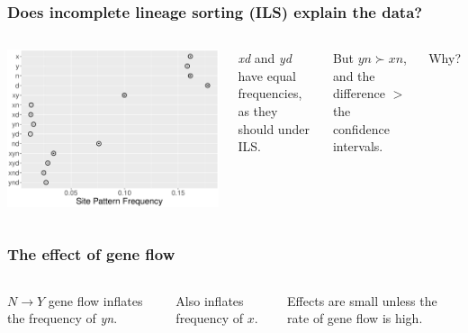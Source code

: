 \documentclass[pdftex,12pt]{beamer}
\begin{document}
\begin{frame}
  \frametitle{Does incomplete lineage sorting (ILS) explain the data?}
  \begin{columns}
    \includegraphics[width=\linewidth]{xynd-frq.pdf}
    \raggedleft

    \textit{xd} and \textit{yd} have equal frequencies, as they should
    under ILS.

    \bigskip

    But $yn \succ xn$, and the difference $>$ the confidence intervals.

    \bigskip

    Why?

  \end{columns}
  \bigskip\raggedleft
\end{frame}

\begin{frame}
  \frametitle{The effect of gene flow}
  \begin{columns}
  
  \raggedleft

  $N\rightarrow Y$ gene flow inflates the frequency of \textit{yn}.

  \bigskip

  Also inflates frequency of $x$.

  \bigskip

  Effects are small unless the rate of gene flow is high.
  \end{columns}
\end{frame}
\end{document}
